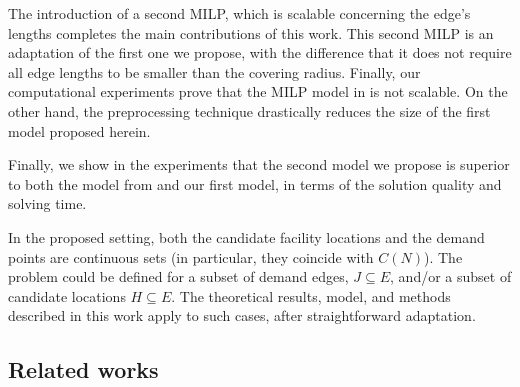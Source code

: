 \documentclass[review]{elsarticle}
\theoremstyle{definition}
\begin{document}
The introduction of a second MILP, which is scalable concerning the edge's lengths completes the main contributions of this work. This second MILP is an adaptation of the first one we propose, with the difference that it does not require all edge lengths to be smaller than the covering radius. Finally, our computational experiments prove that the MILP model in \cite{Hamacher20}  is not scalable. On the other hand, the preprocessing technique drastically reduces the size of the first model proposed herein.

Finally, we show in the experiments that the second model we propose is superior to both  the model from \cite{Hamacher20} and our first model, in terms of the solution quality and solving time.

In the proposed setting, both the candidate facility locations and the demand points are continuous sets (in particular, they coincide with $C(N)$). The problem could be defined for a subset of demand edges, $J\subseteq E$, and/or a subset of candidate locations $H\subseteq E$. The theoretical results, model, and methods described in this work apply to such cases, after straightforward adaptation.



\subsection{Related works}
\end{document}
